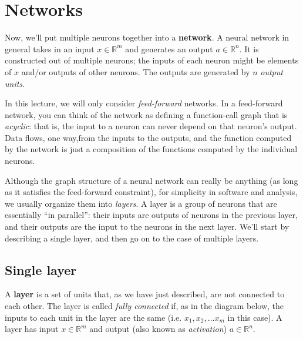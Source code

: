 \documentclass[11pt]{article}
\newcommand{\R}{\mathbb{R}}
\newcommand{\R}{\mathbb{R}}
\newcommand{\qn}[1]{\textcolor{orange}{Quynh: #1}}
\begin{document}
\section{Networks}
Now, we'll put multiple neurons together into a {\bf network}.  A
neural network in general takes in an input $x \in \R^m$ and generates
an output $a \in \R^n$.  It is constructed out of multiple neurons;
the inputs of each neuron might be elements of $x$ and/or outputs of
other neurons.   The outputs are generated by $n$ {\em output units}.  

In this lecture, we will only consider {\it feed-forward} networks.  In a feed-forward network, you can think of the network as defining a function-call graph that is {\em acyclic}:  that is, the input to a
neuron can never depend on that neuron's output.  Data flows, one way,from the inputs to the outputs, and the function computed by the network is just a composition of the functions computed by the individual neurons.   

Although the graph structure of a neural network can really be
anything (as long as it satisfies the feed-forward constraint), for
simplicity in software and analysis, we usually organize them into
{\em layers}.   A layer is a group of neurons that are essentially
``in parallel'':  their inputs are outputs of neurons in the previous
layer, and their outputs are the input to the neurons in the next
layer.   We'll start by describing a single layer, and then go on to
the case of multiple layers.

\subsection{Single layer}
A {\bf layer} is a set of units that, as we have just described, are
not connected to each other. The layer is called
{\em fully connected} if, as in the diagram below, the inputs to each
unit in the layer are the same (i.e. $x_1, x_2, \ldots x_m$ in this
case).  A layer has input $x \in \R^m$ and output (also known as
{\em activation}) $a \in \R^n$.
\end{document}
